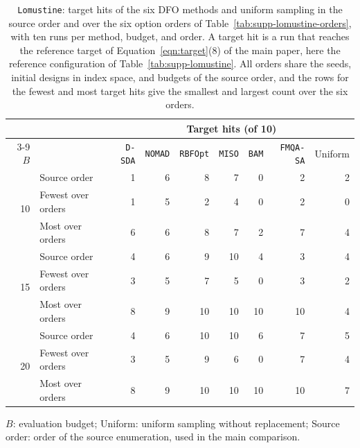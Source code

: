 \begin{table}[htbp]
\centering
\caption{\texttt{Lomustine}: target hits of the six DFO methods and uniform sampling in the source order and over the six option orders of Table~\ref{tab:supp-lomustine-orders}, with ten runs per method, budget, and order.
A target hit is a run that reaches the reference target of Equation~\ifdefined\manuscriptwithsupplement\eqref{eqn:target}\else(8)\fi{} of the main paper, here the reference configuration of Table~\ref{tab:supp-lomustine}.
All orders share the seeds, initial designs in index space, and budgets of the source order, and the rows for the fewest and most target hits give the smallest and largest count over the six orders.}
\label{tab:supp-lomustine-order-hits}
\footnotesize
\setlength{\tabcolsep}{3.5pt}
\begin{threeparttable}
\begin{tabular}{@{}rlrrrrrrr@{}}\toprule
 & & \multicolumn{7}{c}{Target hits (of 10)}\\\cmidrule(l){3-9}
\(B\) & & \texttt{D-SDA} & \texttt{NOMAD} & \texttt{RBFOpt} & \texttt{MISO} & \texttt{BAM} & \texttt{FMQA-SA} & Uniform\\\midrule
\multirow{3}{*}{10} & Source order & 1 & 6 & 8 & 7 & 0 & 2 & 2 \\
 & Fewest over orders & 1 & 5 & 2 & 4 & 0 & 2 & 0 \\
 & Most over orders & 6 & 6 & 8 & 7 & 2 & 7 & 4 \\
\midrule
\multirow{3}{*}{15} & Source order & 4 & 6 & 9 & 10 & 4 & 3 & 4 \\
 & Fewest over orders & 3 & 5 & 7 & 5 & 0 & 3 & 2 \\
 & Most over orders & 8 & 9 & 10 & 10 & 10 & 10 & 4 \\
\midrule
\multirow{3}{*}{20} & Source order & 4 & 6 & 10 & 10 & 6 & 7 & 5 \\
 & Fewest over orders & 3 & 5 & 9 & 6 & 0 & 7 & 4 \\
 & Most over orders & 8 & 9 & 10 & 10 & 10 & 10 & 7 \\
\bottomrule
\end{tabular}
\begin{tablenotes}[flushleft]\footnotesize
\item \(B\): evaluation budget; Uniform: uniform sampling without replacement; Source order: order of the source enumeration, used in the main comparison.
\end{tablenotes}
\end{threeparttable}
\end{table}

